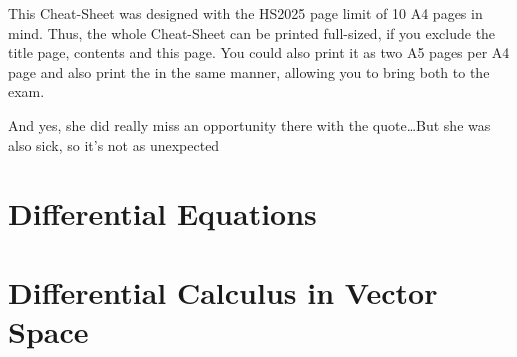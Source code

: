 \documentclass{article}
\begin{document}
This Cheat-Sheet was designed with the HS2025 page limit of 10 A4 pages in mind. 
Thus, the whole Cheat-Sheet can be printed full-sized, if you exclude the title page, contents and this page.
You could also print it as two A5 pages per A4 page and also print the 
\color{MidnightBlue}\color{black} 
\smallhspace in the same manner, allowing you to bring both to the exam.

And yes, she did really miss an opportunity there with the quote\dots But she was also sick, so it's not as unexpected



\newsection
\section{Differential Equations}





\section{Differential Calculus in Vector Space}

\end{document}
